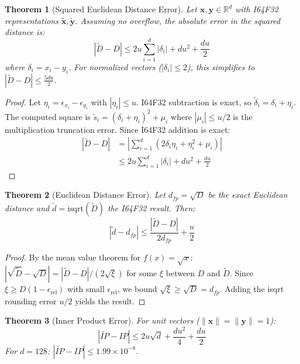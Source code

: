\documentclass[10pt,journal,compsoc]{IEEEtran}
\newtheorem{theorem}{Theorem}
\begin{document}
\begin{theorem}[Squared Euclidean Distance Error]
\label{thm:sq_dist_error}
Let $\mathbf{x}, \mathbf{y} \in \mathbb{R}^d$ with I64F32 representations $\tilde{\mathbf{x}}, \tilde{\mathbf{y}}$. Assuming no overflow, the absolute error in the squared distance is:
\begin{equation}
  |\tilde{D} - D| \leq 2u\sum_{i=1}^{d}|\delta_i| + du^2 + \frac{du}{2}
\end{equation}
where $\delta_i = x_i - y_i$. For normalized vectors ($|\delta_i| \leq 2$), this simplifies to $|\tilde{D} - D| \leq \frac{5du}{2}$.
\end{theorem}

\begin{proof}
Let $\eta_i = \epsilon_{x_i} - \epsilon_{y_i}$ with $|\eta_i| \leq u$. I64F32 subtraction is exact, so $\tilde{\delta}_i = \delta_i + \eta_i$. The computed square is $\tilde{s}_i = (\delta_i + \eta_i)^2 + \mu_i$ where $|\mu_i| \leq u/2$ is the multiplication truncation error. Since I64F32 addition is exact:
\begin{align}
  |\tilde{D} - D| &= \left|\sum_{i=1}^{d}(2\delta_i\eta_i + \eta_i^2 + \mu_i)\right| \\
  &\leq 2u\sum_{i=1}^{d}|\delta_i| + du^2 + \frac{du}{2}
\end{align}
\end{proof}

\begin{theorem}[Euclidean Distance Error]
\label{thm:eucl_dist_error}
Let $d_{fp} = \sqrt{D}$ be the exact Euclidean distance and $\tilde{d} = \mathrm{isqrt}(\tilde{D})$ the I64F32 result. Then:
\begin{equation}
  |\tilde{d} - d_{fp}| \leq \frac{|\tilde{D} - D|}{2d_{fp}} + \frac{u}{2}
\end{equation}
\end{theorem}

\begin{proof}
By the mean value theorem for $f(x) = \sqrt{x}$: $|\sqrt{\tilde{D}} - \sqrt{D}| = |\tilde{D} - D| / (2\sqrt{\xi})$ for some $\xi$ between $D$ and $\tilde{D}$. Since $\xi \geq D(1 - \epsilon_{\text{rel}})$ with small $\epsilon_{\text{rel}}$, we bound $\sqrt{\xi} \geq \sqrt{D} = d_{fp}$. Adding the isqrt rounding error $u/2$ yields the result.
\end{proof}

\begin{theorem}[Inner Product Error]
\label{thm:ip_error}
For unit vectors ($\|\mathbf{x}\| = \|\mathbf{y}\| = 1$):
\begin{equation}
  |\widetilde{IP} - IP| \leq 2u\sqrt{d} + \frac{du^2}{4} + \frac{du}{2}
\end{equation}
For $d = 128$: $|\widetilde{IP} - IP| \leq 1.99 \times 10^{-8}$.
\end{theorem}
\end{document}
